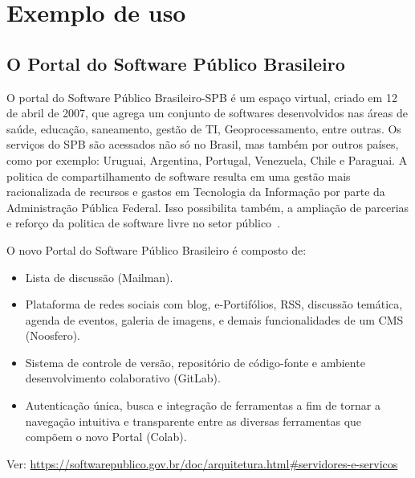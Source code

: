 \chapter{Exemplo de uso}
\label{est}
\section{O Portal do Software Público Brasileiro}
\label{est:sof}

O portal do Software Público Brasileiro-SPB é um espaço virtual, criado em 12 de abril de 2007, que agrega um conjunto de softwares desenvolvidos nas áreas de saúde, educação, saneamento, gestão de TI, Geoprocessamento, entre outras. Os serviços do SPB são acessados não só no Brasil, mas também por outros países, como por exemplo: Uruguai, Argentina, Portugal, Venezuela, Chile e Paraguai. A politica de compartilhamento de software resulta em uma gestão mais racionalizada de recursos e gastos em Tecnologia da Informação por parte da Administração Pública Federal. Isso possibilita também, a ampliação de parcerias e reforço da politica de software livre no setor público~\cite{spb}.

O novo Portal do Software Público Brasileiro é composto de:


\begin{itemize}
    \item Lista de discussão (Mailman).
    \item Plataforma de redes sociais com blog, e-Portifólios, RSS, discussão 
    temática, agenda de eventos, galeria de imagens, e demais funcionalidades de um CMS (Noosfero).
    \item Sistema de controle de versão, repositório de código-fonte e ambiente 
    desenvolvimento colaborativo (GitLab).
    \item Autenticação única, busca e integração de ferramentas a fim de tornar 
    a navegação intuitiva e transparente entre as diversas ferramentas que compõem 
    o novo Portal (Colab).
\end{itemize}


Ver: \url{https://softwarepublico.gov.br/doc/arquitetura.html#servidores-e-servicos}







